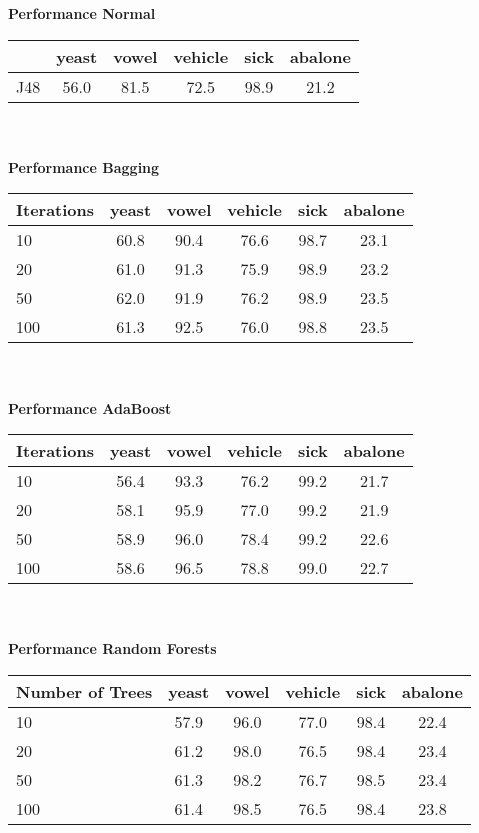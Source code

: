 \textbf{Performance Normal} \\
\begin{tabular}{l|c|c|c|c|c}
	             & yeast & vowel & vehicle &  sick & abalone  \\ \hline
J48              &  56.0 &  81.5 &  72.5   &  98.9 & 21.2     \\ 
\end{tabular}\\ \\


\textbf{Performance Bagging} \\
\begin{tabular}{l|c|c|c|c|c}
Iterations       & yeast & vowel & vehicle &  sick & abalone     \\ \hline
10               &  60.8 & 90.4  &  76.6   & 98.7  &  23.1       \\ \hline
20               &  61.0 & 91.3  &  75.9   & 98.9  &  23.2       \\ \hline
50               &  62.0 & 91.9  &  76.2   & 98.9  &  23.5       \\ \hline
100              &  61.3 & 92.5  &  76.0   & 98.8  &  23.5       \\ 
\end{tabular}\\ \\

\textbf{Performance AdaBoost} \\
\begin{tabular}{l|c|c|c|c|c}
Iterations       & yeast & vowel & vehicle &  sick & abalone     \\ \hline
10               & 56.4  &  93.3 &  76.2   &  99.2 &  21.7       \\ \hline
20               & 58.1  &  95.9 &  77.0   &  99.2 &  21.9       \\ \hline
50               & 58.9  &  96.0 &  78.4   &  99.2 &  22.6       \\ \hline
100              & 58.6  &  96.5 &  78.8   &  99.0 &  22.7       \\ 
\end{tabular}\\ \\


\textbf{Performance Random Forests} \\
\begin{tabular}{l|c|c|c|c|c}
Number of Trees  & yeast & vowel & vehicle &  sick & abalone     \\ \hline
10               & 57.9  & 96.0  & 77.0    &  98.4 &  22.4       \\ \hline
20               & 61.2  & 98.0  & 76.5    &  98.4 &  23.4       \\ \hline
50               & 61.3  & 98.2  & 76.7    &  98.5 &  23.4       \\ \hline
100              & 61.4  & 98.5  & 76.5    &  98.4 &  23.8       \\ 
\end{tabular}\\ \\

